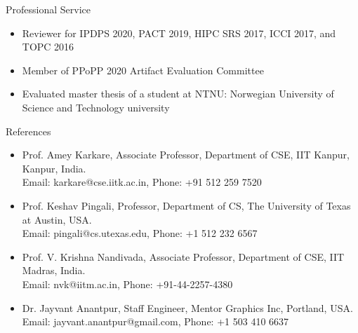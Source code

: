 \documentclass{resume} %
\begin{document}
\begin{rSection}{Professional Service}

\begin{itemize}
\item Reviewer for IPDPS 2020, PACT 2019, HIPC SRS 2017, ICCI 2017, and TOPC 2016
\item Member of PPoPP 2020 Artifact Evaluation Committee
\item Evaluated master thesis of a student at NTNU: Norwegian University of Science and Technology university
\end{itemize}

\end{rSection}




\begin{rSection}{References}

\begin{itemize}
\item Prof. Amey Karkare, Associate Professor, Department of CSE, IIT Kanpur, Kanpur, India. \\
Email: karkare@cse.iitk.ac.in, Phone: +91 512 259 7520
\item Prof. Keshav Pingali, Professor, Department of CS, The University of Texas at Austin, USA. \\
Email: pingali@cs.utexas.edu, Phone: +1 512 232 6567
\item Prof. V. Krishna Nandivada, Associate Professor, Department of CSE, IIT Madras, India. \\
Email: nvk@iitm.ac.in, Phone:  +91-44-2257-4380
\item Dr. Jayvant Anantpur, Staff Engineer, Mentor Graphics Inc, Portland, USA. \\
Email: jayvant.anantpur@gmail.com, Phone: +1 503 410 6637
\end{itemize}

\end{rSection}

\pagebreak
\end{document}
